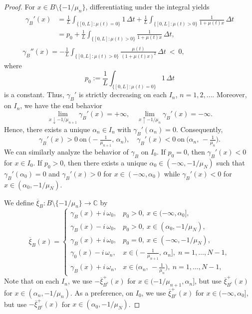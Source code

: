 \documentclass[reqno]{amsart}
\begin{document}
\begin{proof}
For $x\in B\setminus\{-1/\mu_n\}$, differentiating under the integral yields
\begin{gather*}
\begin{aligned}
 \gamma_B'(x)
 &=\frac{1}{L}\int_{\{[0,L]:\mu(t)=0\}} 1\,\Delta t
 + \frac{1}{L}\int_{\{[0,L]:\mu(t)>0\}} \frac{1}{1+\mu(t) x}\,\Delta t\\
 &=p_0+\frac{1}{L}\int_{\{[0,L]:\mu(t)>0\}} \frac{1}{1+\mu(t) x}\,\Delta t,
\end{aligned}\\
\gamma_B''(x)
 =-\frac{1}{L}\int_{\{[0,L]:\mu(t)>0\}} \frac{\mu(t)}{(1+\mu(t) x)^2}\,\Delta t\ <\ 0,
\end{gather*}
where $$p_0:=\frac{1}{L}\int_{\{[0,L]:\mu(t)=0\}} 1\,\Delta t$$ is a constant.
Thus, $\gamma_B'$ is strictly decreasing on each $I_n$, $n=1,2,\dots$.
Moreover, on $I_n$, we have the end behavior
 \[
 \lim_{x\downarrow -1/\mu_{n+1}}\gamma_B'(x)=+\infty,\quad
 \lim_{x\uparrow -1/\mu_{n}}\gamma_B'(x)=-\infty.
 \]
Hence, there exists a unique $\alpha_n\in I_n$ with $\gamma_B'(\alpha_n)=0$.
Consequently,
 \[
 \gamma_B'(x)>0\ \text{on}\ \big(-\tfrac{1}{\mu_{n+1}},\,\alpha_n\big),
 \quad
 \gamma_B'(x)<0\ \text{on}\ \big(\alpha_n,\,-\tfrac{1}{\mu_n}\big).
 \]
We can similarly analyze the behavior of $\gamma_B$ on $I_0$. If $p_0=0$,
then $\gamma_B'(x)<0$ for $x\in I_0$. If $p_0>0$, then there exists a unique
$\alpha_0\in (-\infty,-1/\mu_N)$ such that $\gamma_B'(\alpha_0)=0$ and $\gamma_B'(x)>0$
for $x\in(-\infty,\alpha_0)$ while $\gamma_B'(x)<0$ for $x\in (\alpha_0,-1/\mu_N)$.

We define $\overline{\xi}_B:B\setminus\{-1/\mu_n\}\to\mathbb{C}$ by
 \begin{equation}\label{eff}
 \overline{\xi}_B(x)=
 \begin{cases}
 \gamma_B(x)+ i\,\omega_0, & p_0>0,\ x\in(-\infty,\alpha_0],\\[2pt]
 \gamma_B(x)- i\,\omega_0, & p_0>0,\ x\in(\alpha_0,-1/\mu_N),\\[2pt]
 \gamma_B(x)+ i\,\omega_0, & p_0=0,\ x\in(-\infty,-1/\mu_N),\\[2pt]
 \gamma_0(x)- i\,\omega_n, & x\in\big(-\tfrac{1}{\mu_{n+1}},\,\alpha_n\big],\;
  n=1,\dots,N-1,\\[2pt]
 \gamma_B(x)+ i\,\omega_n, & x\in\big(\alpha_n,\,-\tfrac{1}{\mu_n}\big),\ n=1,\dots,N-1,
 \end{cases}
 \end{equation}
Note that on each $I_n$, we use $-\overline{\xi}_{B^c}^+(x)$ for $x\in(-1/\mu_{n+1},\alpha_n]$,
but use $\overline{\xi}_{B^c}^+(x)$ for $x\in(\alpha_n,-1/\mu_n)$. As a preference, on $I_0$,
we use $\overline{\xi}_{B^c}^+(x)$ for $x\in(-\infty,\alpha_0]$, but use $-\overline{\xi}_{B^c}^+(x)$
for $x\in(\alpha_0,-1/\mu_N)$.


\end{proof}
\end{document}
